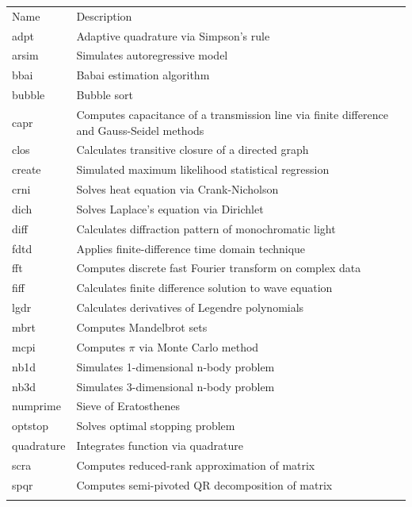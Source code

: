 \begin{table}
  \begin{tabular}{| l | p{10cm} |}
  \hline
  Name & Description \\  \hhline{|=|=|}
  adpt        & Adaptive quadrature via Simpson's rule \\ \hline
  arsim       & Simulates autoregressive model \\ \hline
  bbai        & Babai estimation algorithm \\ \hline
  bubble      & Bubble sort \\ \hline
  capr        & Computes capacitance of a transmission line via finite difference and Gauss-Seidel methods \\ \hline
  clos        & Calculates transitive closure of a directed graph \\ \hline
  create      & Simulated maximum likelihood statistical regression \\ \hline
  crni        & Solves heat equation via Crank-Nicholson \\ \hline
  dich        & Solves Laplace's equation via Dirichlet \\ \hline
  diff        & Calculates diffraction pattern of monochromatic light \\ \hline
  fdtd        & Applies finite-difference time domain technique \\ \hline
  fft         & Computes discrete fast Fourier transform on complex data \\ \hline
  fiff        & Calculates finite difference solution to wave equation \\ \hline
  lgdr        & Calculates derivatives of Legendre polynomials \\ \hline
  mbrt        & Computes Mandelbrot sets \\ \hline
  mcpi        & Computes $\pi$ via Monte Carlo method \\ \hline
  nb1d        & Simulates 1-dimensional n-body problem \\ \hline
  nb3d        & Simulates 3-dimensional n-body problem \\ \hline
  numprime    & Sieve of Eratosthenes \\ \hline
  optstop     & Solves optimal stopping problem \\ \hline
  quadrature  & Integrates function via quadrature \\ \hline
  scra        & Computes reduced-rank approximation of matrix \\ \hline
  spqr        & Computes semi-pivoted QR decomposition of matrix \\ \hhline{|=|=|}

\end{tabular}
\end{table}
